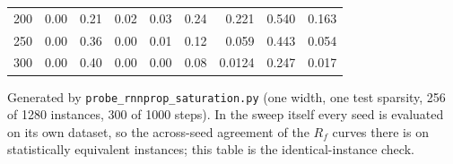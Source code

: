 \begin{table}[htbp]
\begin{tabular}{@{} r rrrr r r rr @{}}
200 & 0.00 & 0.21 & 0.02 & 0.03 & 0.24 & 0.221 & 0.540 & 0.163 \\
250 & 0.00 & 0.36 & 0.00 & 0.01 & 0.12 & 0.059 & 0.443 & 0.054 \\
300 & 0.00 & 0.40 & 0.00 & 0.00 & 0.08 & 0.0124 & 0.247 & 0.017 \\
\bottomrule
\end{tabular}
\vspace{2pt}
\begin{minipage}{\linewidth}\footnotesize
Generated by \texttt{probe\_rnnprop\_saturation.py} (one width, one test sparsity, 256 of 1280 instances, 300 of 1000 steps). In the sweep itself every seed is evaluated on its own dataset, so the across-seed agreement of the $R_f$ curves there is on statistically equivalent instances; this table is the identical-instance check.
\end{minipage}
\end{table}
